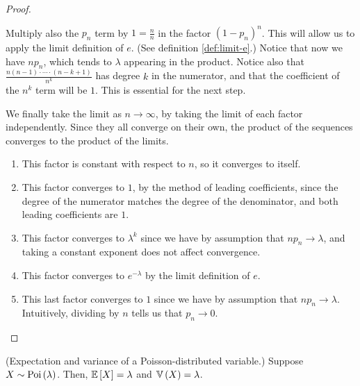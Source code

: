 \documentclass[11pt]{article}
\begin{document}
\begin{proof}
\begin{description}
            Multiply also the $p_n$ term by $1 = \frac{n}{n}$ in the factor
            $(1 - p_n)^n$.
            This will allow us to apply the limit definition of $e$.
            (See definition \ref{def:limit-e}.)
            Notice that now we have $n p_n$, which tends to $\lambda$ appearing
            in the product.
            Notice also that $\frac{n(n-1) \cdot\cdots\cdot (n-k+1)}{n^k}$ has
            degree $k$ in the numerator, and that the coefficient of the $n^k$
            term will be $1$.
            This is essential for the next step.
        \item[\stepAB{4}{5}]
            We finally take the limit as $n \to \infty$, by taking the limit of
            each factor independently.
            Since they all converge on their own, the product of the sequences
            converges to the product of the limits.

            \begin{enumerate}
                \item
                    This factor is constant with respect to $n$, so it
                    converges to itself.
                \item
                    This factor converges to $1$, by the method of leading
                    coefficients, since the degree of the numerator matches the
                    degree of the denominator, and both leading coefficients
                    are $1$.
                \item
                    This factor converges to $\lambda^k$ since we have by
                    assumption that $n p_n \to \lambda$, and taking a constant
                    exponent does not affect convergence.
                \item
                    This factor converges to $e^{-\lambda}$ by the limit
                    definition of $e$.
                \item
                    This last factor converges to $1$ since we have by
                    assumption that $n p_n \to \lambda$. Intuitively, dividing
                    by $n$ tells us that $p_n \to 0$.
            \end{enumerate}
    \end{description}
\end{proof}

\begin{thm}{(Expectation and variance of a Poisson-distributed variable.)}
    \label{thm:poisson-expectation-variance}
    Suppose $X \sim \operatorname{Poi}\left(\lambda\right)$.
    Then, $\operatorname{\mathbb{E}}{\left[X\right]} = \lambda$ and $\operatorname{\mathbb{V}}{\left(X\right)} = \lambda$.
\end{thm}
\end{document}
